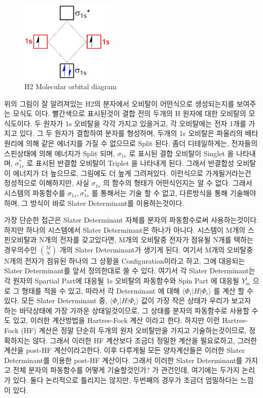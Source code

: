 \documentclass[11pt]{article}
\begin{document}
\begin{figure}[htbp]
  \centering
  \includegraphics[width=0.4\textwidth]{fig/Moecular-Orbital-DiagramH2.png}
  \caption{H2 Molecular orbital diagram}
  \label{fig:example2}
\end{figure}

위의 그림이 잘 알려져있는 H2의 분자에서 오비탈이 어떤식으로 생성되는지를 보여주는 모식도 이다. 
빨간색으로 표시된것이 결합 전의 두개의 H 원자에 대한 오비탈의 모식도이다. 두 원자가 1s 오비탈을 각각 가지고 있을거고, 각 오비탈에는 전자 1개를 가지고 있다. 
그 두 원자가 결합하여 분자를 형성하며, 두개의 1s 오비탈은 파울리의 배타원리에 의해 같은 에너지를 가질 수 없으므로 Split 된다. 좀더 디테일하게는, 전자들의 스핀상태에 의해 에너지가 Split 되며, 
\(\sigma_{1s}\) 로 표시된 결합 오비탈이 Singlet 을 나타내며, \(\sigma_{1s}^*\) 로 표시된 반결합 오비탈이 Triplet 을 나타내게 된다. 그래서 반결합성 오비탈이 에너지가 더 높으므로, 그림에도 더 높게 그려져있다. 
이런식으로 가게될거라는건 정성적으로 이해하지만, 사실 \(\sigma_{1s}\) 의 함수의 형태가 어떤식인지는 알 수 없다. 
그래서 시스템의 파동함수를 \(\sigma_{1s},\sigma_{1s}^*\) 를 통해서는 기술 할 수 없고, 다른방식을 통해 기술해야하며, 그 방식이 바로 Slater Determinant를 이용하는것이다. 

가장 단순한 접근은 Slater Determinant 자체를 분자의 파동함수로써 사용하는것이다. 
하지만 하나의 시스템에서 Slater Determinant은 하나가 아니다. 
시스템이 M개의 스핀오비탈과 N개의 전자를 갖고있다면,  M개의 오비탈중 전자가 점유될 N개를 택하는 경우의수인 \(\binom{M}{N}\) 개의 Slater Determinant가 생기게 된다. 
여기서 M개의 오비탈중 N개의 전자가 점유된 하나의 그 상황을 Configuration이라고 하고, 그에 대응되는 Slater Determinant를 앞서 정의한대로 쓸 수 있다. 
여기서 각 Slater Determinant는 각 원자의 Spartial Part에 대응될 1s 오비탈의 파동함수와 Spin Part 에 대응될 \(Y^l_m\) 으로 그 형태를 적을 수 있고, 따라서 각 Determinant 에 대해 \(\langle \Phi_i|H|\Phi_i \rangle\) 를 계산 할 수 있다. 
모든 Slater Determinant 중, \(\langle \Phi_i|H|\Phi_i \rangle\) 값이 가장 작은 상태가 우리가 보고자 하는 바닥상태에 가장 가까운 상태일것이므로, 그 상태를 분자의 파동함수로 사용할 수도 있고, 
이러한 계산방법을 Hartree-Fock 계산 이라고 한다. 
하지만 이런 Hartree-Fock (HF) 계산은 정말 단순히 두개의 원자 오비탈만을 가지고 기술하는것이므로, 정확하지는 않다. 그래서 이러한 HF 계산보다 조금더 정밀한 계산을 필요로하고, 그러한 계산을 post-HF 계산이라고한다. 
이후 다루게될 모든 양자계산들은 이러한 Slater Determinant를 이용한 post-HF 계산이다. 
그래서 이러한 Slater Determinant를 가지고 전체 분자의 파동함수를 어떻게 기술할것인가? 가 관건인데, 여기에는 두가지 논리가 있다. 둘다 논리적으로 틀리지는 않지만, 두번째의 경우가 조금더 엄밀하다는 느낌이 있다. 
\end{document}
